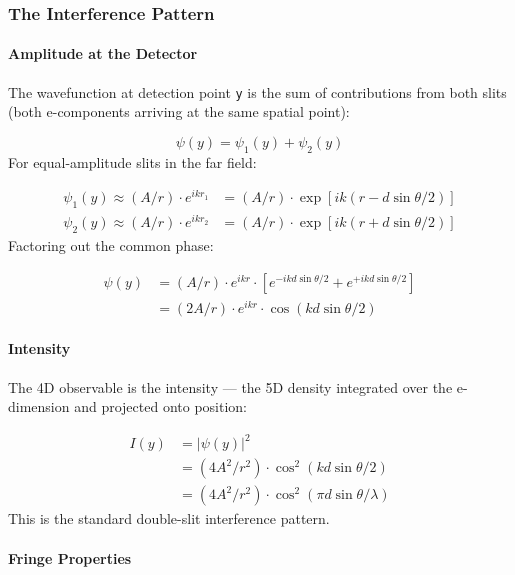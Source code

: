 \documentclass[aps,prd,preprint,superscriptaddress,longbibliography,floatfix]{revtex4-2}
\theoremstyle{remark}
\begin{document}
\subsubsection{The Interference Pattern}


\paragraph{Amplitude at the Detector}

The wavefunction at detection point \texttt{y} is the sum of contributions from both slits (both e-components arriving at the same spatial point):


\begin{equation}
    \psi(y) = \psi_{1}(y) + \psi_{2}(y)
\end{equation}
For equal-amplitude slits in the far field:


\begin{align}
    \psi_{1}(y) \approx (A/r) \cdot e^{ikr_{1}} &= (A/r) \cdot \exp[ik(r - d \sin \theta/2)] \\
    \psi_{2}(y) \approx (A/r) \cdot e^{ikr_{2}} &= (A/r) \cdot \exp[ik(r + d \sin \theta/2)]
\end{align}
Factoring out the common phase:


\begin{align}
    \psi(y) &= (A/r) \cdot e^{ikr} \cdot [e^{-ikd \sin \theta/2} + e^{+ikd \sin \theta/2}] \\
    & = (2A/r) \cdot e^{ikr} \cdot \cos(kd \sin \theta/2)
\end{align}

\paragraph{Intensity}

The 4D observable is the intensity --- the 5D density integrated over the e-dimension and projected onto position:


\begin{align}
    I(y) &= |\psi(y)|^{2} \\
    & = (4A^{2}/r^{2}) \cdot \cos^2(kd \sin \theta/2) \\
    & = (4A^{2}/r^{2}) \cdot \cos^2(\pi d \sin \theta / \lambda)
\end{align}
This is the standard double-slit interference pattern.


\paragraph{Fringe Properties}
\end{document}
